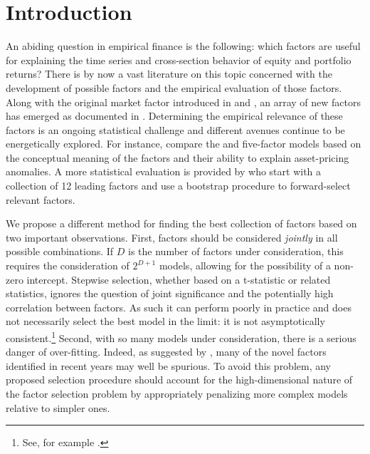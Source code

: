 \section{Introduction}
An abiding question in empirical finance is the following: which factors are useful for explaining the time series and cross-section behavior of equity and portfolio returns? 
There is by now a vast literature on this topic concerned with the development of possible factors and the empirical evaluation of those factors. 
Along with the original market factor introduced in \cite{sharpe1964capital} and \cite{lintner1965valuation}, an array of new factors has emerged as documented in \cite{harvey2015and}. 
Determining the empirical relevance of these factors is an ongoing statistical challenge and different avenues continue to be energetically explored. 
For instance, \cite{hou2014comparison} compare the \cite{hou2014digesting} and \cite{fama2015five} five-factor models based on the conceptual meaning of the factors and their ability to explain asset-pricing anomalies.
A more statistical evaluation is provided by \cite{harvey2015lucky} who start with a collection of 12 leading factors and use a bootstrap procedure to forward-select relevant factors. 

We propose a different method for finding the best collection of factors based on two important observations.
First, factors should be considered \emph{jointly} in all possible combinations. 
If $D$ is the number of factors under consideration, this requires the consideration of $2^{D+1}$ models, allowing for the possibility of a non-zero intercept.
Stepwise selection, whether based on a t-statistic or related statistics, ignores the question of joint significance and the potentially high correlation between factors.
As such it can perform poorly in practice and does not necessarily select the best model in the limit: it is not asymptotically consistent.\footnote{See, for example \cite{judd2011data}.}
Second, with so many models under consideration, there is a serious danger of over-fitting.
Indeed, as suggested by \cite{harvey2015and}, many of the novel factors identified in recent years may well be spurious.
To avoid this problem, any proposed selection procedure should account for the high-dimensional nature of the factor selection problem by appropriately penalizing more complex models relative to simpler ones.

